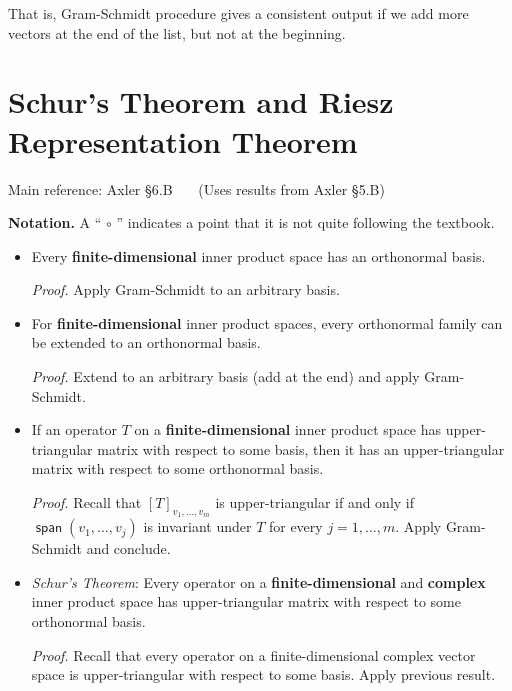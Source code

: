 \documentclass[11pt]{article}
\newcommand{\1}{\mathbf{1}}
\newcommand{\0}{\mathbf{0}}
\DeclareMathOperator{\myspan}{\mathsf{span}}
\begin{document}
{\begin{itemize}
That is, Gram-Schmidt procedure gives a consistent output if we add more vectors at the end of the list, but not at the beginning.

\end{itemize}


\clearpage
\section{Schur's Theorem and Riesz Representation Theorem}

Main reference:
Axler \S6.B
\ \ \
(Uses results from Axler \S5.B)

\textbf{Notation.}
A `` $\circ$ '' indicates a point that it is not quite following the textbook.

\begin{itemize}

\item

Every \textbf{finite-dimensional} inner product space has an orthonormal basis.

\emph{Proof.}
Apply Gram-Schmidt to an arbitrary basis.

\item

For \textbf{finite-dimensional} inner product spaces, every orthonormal family can be extended to an orthonormal basis.

\emph{Proof.}
Extend to an arbitrary basis (add at the end) and apply Gram-Schmidt.

\item

If an operator $T$ on a \textbf{finite-dimensional} inner product space has upper-triangular matrix with respect to some basis, then it has an upper-triangular matrix with respect to some orthonormal basis.

\emph{Proof.}
Recall that $[T]_{v_1,\dots,v_m}$ is upper-triangular if and only if $\myspan(v_1,\dots,v_j)$ is invariant under $T$ for every $j = 1,\dots,m$.
Apply Gram-Schmidt and conclude.

\item

\emph{Schur's Theorem}: Every operator on a \textbf{finite-dimensional} and \textbf{complex} inner product space has upper-triangular matrix with respect to some orthonormal basis.

\emph{Proof.}
Recall that every operator on a finite-dimensional complex vector space is upper-triangular with respect to some basis.
Apply previous result.


\end{itemize}}
\end{document}

